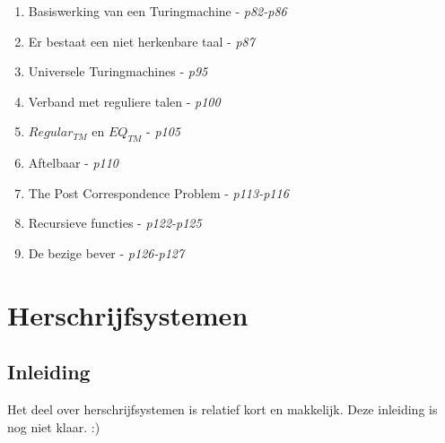 \documentclass[10pt,a4paper]{article}
\begin{document}
\begin{enumerate}
	\item Basiswerking van een Turingmachine - \emph{p82-p86}
	\item Er bestaat een niet herkenbare taal - \emph{p87}
	\item Universele Turingmachines - \emph{p95}
	\item Verband met reguliere talen - \emph{p100}
	\item $Regular_{TM}$ en $EQ_{TM}$ - \emph{p105}
	\item Aftelbaar - \emph{p110}
	\item The Post Correspondence Problem - \emph{p113-p116}
	\item Recursieve functies - \emph{p122-p125}
	\item De bezige bever - \emph{p126-p127}
\end{enumerate}









\newpage
\section{Herschrijfsystemen}

\subsection{Inleiding}

Het deel over herschrijfsystemen is relatief kort en makkelijk. Deze inleiding is nog niet klaar. :)



\end{document}
